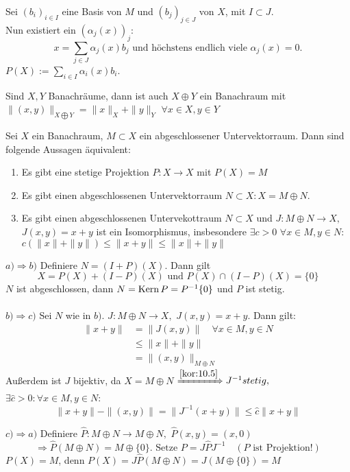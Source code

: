 \begin{beweis}
	Sei $(b_{i})_{i \in I}$ eine Basis von $M$ und $(b_{j})_{j \in J}$ von $X$, mit $I \subset J$. \\
	Nun existiert ein $(\alpha_{j}(x))_{j}$:
	\[ x = \sum_{j \in J} \alpha_{j}(x) b_{j} \text{ und höchstens endlich viele } \alpha_{j}(x) = 0. \]
	$P(X) := \sum_{i \in I} \alpha_{i}(x) b_{i}$.
\end{beweis}


\begin{erinnerung}
	Sind $X, Y$ Banachräume, dann ist auch $X \oplus Y$ ein Banachraum mit $\| (x, y) \|_{X \bigoplus Y} = \| x \|_{X} + \| y \|_{Y}$ $\forall x \in X, y \in Y$
\end{erinnerung}


\begin{satz}
	Sei $X$ ein Banachraum, $M \subset X$ ein abgeschlossener Untervektorraum. Dann sind folgende Aussagen äquivalent:
	\begin{enumerate}[label=\alph*\upshape)]
		\item Es gibt eine stetige Projektion $P: X \rightarrow X$ mit $P(X) = M$
		\item Es gibt einen abgeschlossenen Untervektorraum $N \subset X: X = M \oplus N$.
		\item Es gibt einen abgeschlossenen Untervekottraum $N \subset X$ und $J: M \oplus N \rightarrow X,$ $J(x, y) = x + y$ ist ein Isomorphismus, insbesondere $\exists c > 0$ $\forall x \in M, y \in N:$ $c \left( \|x \| + \|y \| \right) \leq \|x + y \| \leq \|x \| + \| y \| $
	\end{enumerate}
\end{satz}

\begin{beweis}
	$a) \Rightarrow b)$ Definiere $N = (I + P)(X)$. Dann gilt
		\[ X = P(X) + (I - P)(X) \text{ und } P(X) \cap (I - P)(X) = \{ 0 \} \]
		$N$ ist abgeschlossen, dann $N = \mathop{\rm Kern}\nolimits{P} = P^{-1}\{ 0 \}$ und $P$ ist stetig.	\\ \\
	$b) \Rightarrow c)$ Sei $N$ wie in $b)$. $J: M \oplus N \rightarrow X,$ $J(x, y) = x + y$. Dann gilt:
		\begin{align*}
			\| x + y \| & = \| J(x, y) \| \quad \forall x \in M, y \in N \\
						& \leq \| x \| + \| y \| \\
						& = \| (x, y) \|_{M \oplus N}
		\end{align*}
		Au{\ss}erdem ist $J$ bijektiv, da $X = M \oplus N$
		$\xRightarrow[]{\ref{kor:10.5}} J^{-1} stetig,$ $\exists \hat{c} > 0: \forall x \in M, y \in N$:
		\[ \| x + y \| - \| (x, y) \| = \| J^{-1}(x + y) \| \leq \hat{c} \| x + y \| \]

	$c) \Rightarrow a)$ Definiere $\hat{P}: M \oplus N \rightarrow M \oplus N,$ $\hat{P}(x, y) = (x, 0)$
		\[ \Rightarrow \hat{P}(M \oplus N) = M \oplus \{ 0 \}. \text{ Setze } P = J \hat{P} J^{-1} \quad (P \text{ ist Projektion!}) \]
		$P(X) = M$, denn $P(X) = J \hat{P}(M \oplus N) = J (M \oplus \{ 0 \}) = M$
\end{beweis}


